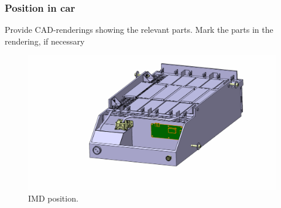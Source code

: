 \subsubsection{Position in car}
Provide CAD-renderings showing the relevant parts. Mark the parts in the rendering, if necessary

\begin{figure}[H]
	\centering
	\includegraphics[width=\textwidth,trim={0cm 0cm 0cm 0cm},clip]{./img/IMD-position.jpg}
	\caption{IMD position.}
	\label{fig:IMD-position}
\end{figure}

